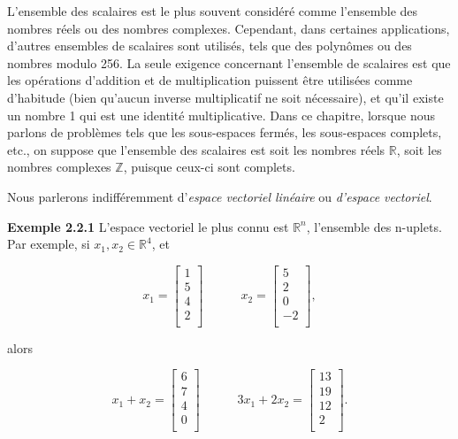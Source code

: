 \documentclass[11pt,twoside,a4paper]{article}
\begin{document}
L'ensemble des scalaires est le plus souvent considéré comme l'ensemble des nombres réels ou des nombres complexes. Cependant, dans certaines applications, d'autres ensembles de scalaires sont utilisés, tels que des polynômes ou des nombres modulo 256. 
La seule exigence concernant l'ensemble de scalaires est que les opérations d'addition et de multiplication puissent être utilisées comme d'habitude (bien qu'aucun inverse multiplicatif ne soit nécessaire), et qu'il existe un nombre 1 qui est une identité multiplicative. 
Dans ce chapitre, lorsque nous parlons de problèmes tels que les sous-espaces fermés, les sous-espaces complets, etc., on suppose que l'ensemble des scalaires est soit les nombres réels $\mathbb{R}$, soit les nombres complexes $\mathbb{Z}$, puisque ceux-ci sont complets.

Nous parlerons indifféremment d'\textit{espace vectoriel linéaire} ou \textit{d'espace vectoriel}.
\vspace{4mm}

\textbf{Exemple 2.2.1} L'espace vectoriel le plus connu est $\mathbb{R}^n$, l'ensemble des n-uplets. Par exemple, si $x_1, x_2 \in \mathbb{R}^4$, et

\begin{equation*}
  x_1 = \begin{bmatrix}
    1 \\
    5 \\
    4 \\
    2 \\
  \end{bmatrix}
  \quad \quad \quad
  x_2 = \begin{bmatrix}
    5 \\
    2 \\
    0 \\
    -2 \\
  \end{bmatrix},
\end{equation*}

alors

\begin{equation*}
  x_1 + x_2 = \begin{bmatrix}
    6 \\
    7 \\
    4 \\
    0 \\
  \end{bmatrix}
  \quad \quad \quad
  3x_1 + 2x_2 = \begin{bmatrix}
    13 \\
    19 \\
    12 \\
    2 \\
  \end{bmatrix}.
\end{equation*}
\end{document}
